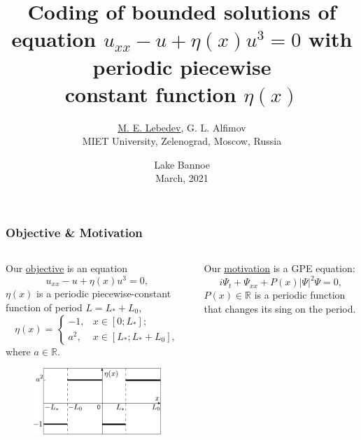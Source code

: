 \documentclass [10pt] {beamer}
\title{Coding of bounded solutions of equation $u_{xx} - u + \eta(x) u^3 = 0$ with periodic piecewise \\ constant function $\eta(x)$}
\author{\underline{M. E. Lebedev}, G. L. Alfimov \\ {\small MIET University, Zelenograd, Moscow, Russia}}
\date{Lake Bannoe \\ March, 2021}
\begin{document}
\begin{frame}
	\titlepage
\end{frame}

\begin{frame}
	\frametitle{Objective \& Motivation}
	\begin{columns}[T]
		\begin{column}{.5\textwidth}
			Our \underline{objective} is an equation
			\begin{equation}
				u_{xx} - u + \eta(x) u^3 = 0,
				\label{eq:main}
			\end{equation}
			$\eta(x)$ is a periodic piecewise-constant function of period $L = L_* + L_0$,
			\begin{equation*}
				\eta(x) = \left\{
					\begin{array}{rl}
						-1, &  x \in [0; L_*]; \\[1.5mm]
						a^2, & x \in [L_*; L_* + L_0],
					\end{array}
				\right.
			\end{equation*}
			where $a \in \mathbb{R}$.
			\begin{figure}
			\includegraphics[width = 1\textwidth]{pic/piecewise-constant.pdf}
			\end{figure}
		\end{column}
		\hfill
		\begin{column}{.5\textwidth}
			Our \underline{motivation} is a GPE equation:
			\begin{equation}
				i \Psi_t + \Psi_{xx} + P(x) |\Psi|^2 \Psi = 0,
			\end{equation}
			$P(x) \in \mathbb{R}$ is a periodic function that changes its sing on the period.

			\vspace{10pt}
			

\end{column}
\end{columns}
\end{frame}
\end{document}
